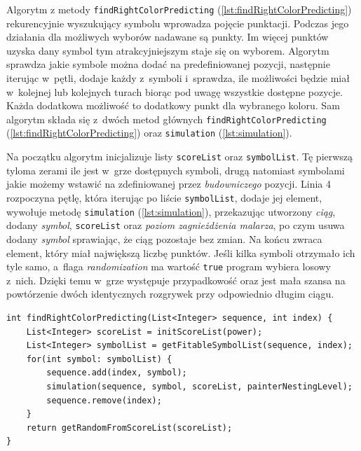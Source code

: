 \documentclass[document]{xmgr}
\begin{document}
Algorytm z metody \texttt{findRightColorPredicting} (\ref{lst:findRightColorPredicting}) rekurencyjnie wyszukujący symbolu wprowadza pojęcie punktacji. Podczas jego działania dla możliwych wyborów nadawane są punkty. Im więcej punktów uzyska dany symbol tym atrakcyjniejszym staje się on wyborem. Algorytm sprawdza jakie symbole można dodać na predefiniowanej pozycji, następnie iterując w~pętli, dodaje każdy z~symboli i~sprawdza, ile możliwości będzie miał w~kolejnej lub kolejnych turach biorąc pod uwagę wszystkie dostępne pozycje. Każda dodatkowa możliwość to dodatkowy punkt dla wybranego koloru. Sam algorytm składa się z~dwóch metod głównych \mbox{\texttt{findRightColorPredicting}} (\ref{lst:findRightColorPredicting}) oraz \texttt{simulation} (\ref{lst:simulation}).

Na początku algorytm inicjalizuje listy \texttt{scoreList} oraz \texttt{symbolList}. Tę pierwszą tyloma zerami ile jest w~grze dostępnych symboli, drugą natomiast symbolami jakie możemy wstawić na zdefiniowanej przez \emph{budowniczego} pozycji. Linia 4 rozpoczyna pętlę, która iterując po liście \texttt{symbolList}, dodaje jej element, wywołuje metodę \texttt{simulation} (\ref{lst:simulation}), przekazując utworzony \emph{ciąg}, dodany \emph{symbol}, \texttt{scoreList} oraz \emph{poziom zagnieżdżenia malarza}, po czym usuwa dodany \emph{symbol} sprawiając, że ciąg pozostaje bez zmian. Na końcu zwraca element, który miał największą liczbę punktów. Jeśli kilka symboli otrzymało ich tyle samo, a~flaga \emph{randomization} ma wartość \texttt{true} program wybiera losowy z~nich. Dzięki temu w~grze występuje przypadkowość oraz jest mała szansa na powtórzenie dwóch identycznych rozgrywek przy odpowiednio długim ciągu.

\begin{lstlisting}[caption={Metoda szukająca symbolu, wykorzystująca rekurencję.},label=lst:findRightColorPredicting]
int findRightColorPredicting(List<Integer> sequence, int index) {
	List<Integer> scoreList = initScoreList(power);
	List<Integer> symbolList = getFitableSymbolList(sequence, index);
	for(int symbol: symbolList) {
		sequence.add(index, symbol);
		simulation(sequence, symbol, scoreList, painterNestingLevel);
		sequence.remove(index);
	}
	return getRandomFromScoreList(scoreList);
}
\end{lstlisting}
\end{document}
